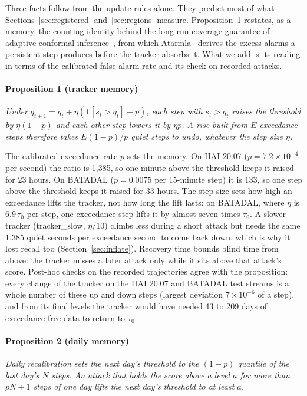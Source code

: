 \documentclass[sigconf]{acmart}
\begin{document}
Three facts follow from the update rules alone. They predict most of what
Sections~\ref{sec:registered} and~\ref{sec:regions} measure. Proposition~1 restates, as a
memory, the counting identity behind the long-run coverage guarantee of adaptive conformal
inference~\cite{gibbs2021aci}, from which Atarmla~\cite{atarmla2026price} derives the excess alarms a
persistent step produces before the tracker absorbs it. What we add is its reading in terms of the
calibrated false-alarm rate and its check on recorded attacks.

\paragraph{Proposition 1 (tracker memory)} \emph{Under $q_{t+1} = q_t + \eta(\mathbf{1}[s_t > q_t]
- p)$, each step with $s_t > q_t$ raises the threshold by $\eta(1-p)$ and each other step lowers it
by $\eta p$. A rise built from $E$ exceedance steps therefore takes $E(1-p)/p$ quiet steps to undo,
whatever the step size $\eta$.}

The calibrated exceedance rate $p$ sets the memory. On HAI 20.07 ($p = 7.2 \times 10^{-4}$ per
second) the ratio is 1,385, so one minute above the threshold keeps it raised for 23 hours. On
BATADAL ($p = 0.0075$ per 15-minute step) it is 133, so one step above the threshold keeps it raised
for 33 hours. The step size sets how high an exceedance lifts the tracker, not how long the lift
lasts: on BATADAL, where $\eta$ is $6.9\,\tau_0$ per step, one exceedance step lifts it by almost seven
times $\tau_0$. A slower tracker (tracker\_slow, $\eta/10$) climbs less during a short attack but needs
the same 1,385 quiet seconds per exceedance second to come back down, which is why it lost recall too
(Section~\ref{sec:inflate}). Recovery time bounds blind time from above: the tracker misses a later
attack only while it sits above that attack's score. Post-hoc checks on the recorded trajectories
agree with the proposition: every change of the tracker on the HAI 20.07 and BATADAL test streams is
a whole number of these up and down steps (largest deviation $7 \times 10^{-6}$ of a step), and from its final levels the tracker would have needed 43 to 209 days of exceedance-free data to return
to $\tau_0$.

\paragraph{Proposition 2 (daily memory)} \emph{Daily recalibration sets the next day's threshold to
the $(1-p)$ quantile of the last day's $N$ steps. An attack that holds the score above a level $a$
for more than $pN + 1$ steps of one day lifts the next day's threshold to at least $a$.}
\end{document}
